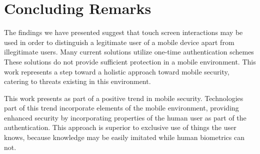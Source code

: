 \section{Concluding Remarks}
The findings we have presented suggest that 
touch screen interactions may be used in order to
distinguish a legitimate user of a mobile device apart from
illegitimate users.
%
Many current solutions utilize one-time authentication schemes
These solutions do not provide sufficient protection in a mobile environment.
This work represents a step toward a
holistic approach toward mobile security,
catering to threats existing in this environment.


This work presents as part of a positive trend in mobile security.
Technologies part of this trend
incorporate elements of the mobile environment,
providing enhanced security by
incorporating
properties of the human user as part of the authentication.
This approach is superior to exclusive use of
things the user knows, because
knowledge may be easily imitated while
human biometrics can not.